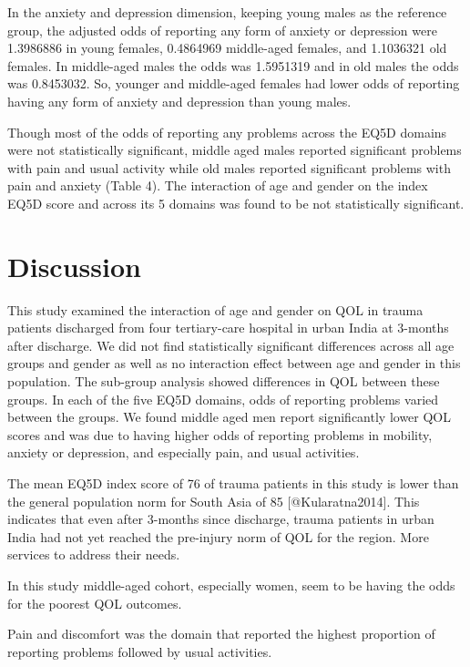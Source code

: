 \documentclass[
]{article}
\begin{document}
In the anxiety and depression dimension, keeping young males as the
reference group, the adjusted odds of reporting any form of anxiety or
depression were 1.3986886 in young females, 0.4864969 middle-aged
females, and 1.1036321 old females. In middle-aged males the odds was
1.5951319 and in old males the odds was 0.8453032. So, younger and
middle-aged females had lower odds of reporting having any form of
anxiety and depression than young males.

Though most of the odds of reporting any problems across the EQ5D
domains were not statistically significant, middle aged males reported
significant problems with pain and usual activity while old males
reported significant problems with pain and anxiety (Table 4). The
interaction of age and gender on the index EQ5D score and across its 5
domains was found to be not statistically significant.

\hypertarget{discussion}{%
\section{Discussion}\label{discussion}}

This study examined the interaction of age and gender on QOL in trauma
patients discharged from four tertiary-care hospital in urban India at
3-months after discharge. We did not find statistically significant
differences across all age groups and gender as well as no interaction
effect between age and gender in this population. The sub-group analysis
showed differences in QOL between these groups. In each of the five EQ5D
domains, odds of reporting problems varied between the groups. We found
middle aged men report significantly lower QOL scores and was due to
having higher odds of reporting problems in mobility, anxiety or
depression, and especially pain, and usual activities.

The mean EQ5D index score of 76 of trauma patients in this study is
lower than the general population norm for South Asia of 85
{[}@Kularatna2014{]}. This indicates that even after 3-months since
discharge, trauma patients in urban India had not yet reached the
pre-injury norm of QOL for the region. More services to address their
needs.

In this study middle-aged cohort, especially women, seem to be having
the odds for the poorest QOL outcomes.

Pain and discomfort was the domain that reported the highest proportion
of reporting problems followed by usual activities.
\end{document}
